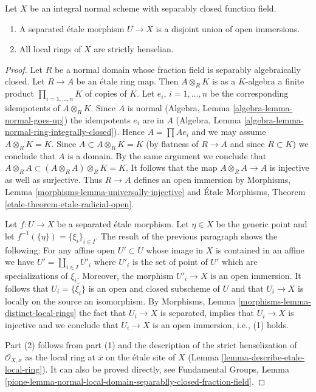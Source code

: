 \begin{lemma}
\label{lemma-normal-scheme-with-alg-closed-function-field}
Let $X$ be an integral normal scheme with separably closed
function field.
\begin{enumerate}
\item A separated \'etale morphism $U \to X$ is a
disjoint union of open immersions.
\item All local rings of $X$ are strictly henselian.
\end{enumerate}
\end{lemma}

\begin{proof}
Let $R$ be a normal domain whose fraction field is separably algebraically
closed. Let $R \to A$ be an \'etale ring map. Then
$A \otimes_R K$ is as a $K$-algebra a finite product
$\prod_{i = 1, \ldots, n} K$ of copies of $K$. Let $e_i$, $i = 1, \ldots, n$
be the corresponding idempotents of $A \otimes_R K$. Since $A$ is normal
(Algebra, Lemma \ref{algebra-lemma-normal-goes-up})
the idempotents $e_i$ are in $A$
(Algebra, Lemma \ref{algebra-lemma-normal-ring-integrally-closed}).
Hence $A = \prod Ae_i$ and we may assume $A \otimes_R K = K$.
Since $A \subset A \otimes_R K = K$ (by flatness of $R \to A$ and
since $R \subset K$) we conclude that $A$ is a domain.
By the same argument we conclude that
$A \otimes_R A \subset (A \otimes_R A) \otimes_R K = K$.
It follows that the map $A \otimes_R A \to A$ is
injective as well as surjective. Thus $R \to A$ defines an
open immersion by
Morphisms, Lemma \ref{morphisms-lemma-universally-injective}
and
\'Etale Morphisms, Theorem \ref{etale-theorem-etale-radicial-open}.

\medskip\noindent
Let $f : U \to X$ be a separated \'etale morphism. Let $\eta \in X$
be the generic point and let $f^{-1}(\{\eta\}) = \{\xi_i\}_{i \in I}$.
The result of the previous paragraph shows the following:
For any affine open $U' \subset U$ whose image in $X$ is contained in
an affine we have $U' = \coprod_{i \in I} U'_i$ where $U'_i$
is the set of point of $U'$ which are specializations of $\xi_i$.
Moreover, the morphism $U'_i \to X$ is an open immersion.
It follows that $U_i = \overline{\{\xi_i\}}$ is an open and closed
subscheme of $U$ and that $U_i \to X$ is locally on the source
an isomorphism. By Morphisms,
Lemma \ref{morphisms-lemma-distinct-local-rings}
the fact that $U_i \to X$ is separated, implies that
$U_i \to X$ is injective and we conclude that $U_i \to X$
is an open immersion, i.e., (1) holds.

\medskip\noindent
Part (2) follows from part (1) and the description of the strict
henselization of $\mathcal{O}_{X, x}$ as the local ring at $\overline{x}$
on the \'etale site of $X$ (Lemma \ref{lemma-describe-etale-local-ring}).
It can also be proved directly, see
Fundamental Groups, Lemma
\ref{pione-lemma-normal-local-domain-separablly-closed-fraction-field}.
\end{proof}

